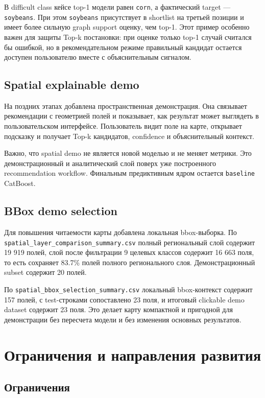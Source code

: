 \documentclass[a4paper,article,14pt]{extarticle}
\begin{document}
В difficult class кейсе top-1 модели равен \texttt{corn}, а фактический target --- \texttt{soybeans}. При этом \texttt{soybeans} присутствует в shortlist на третьей позиции и имеет более сильную graph support оценку, чем top-1. Этот пример особенно важен для защиты Top-k постановки: при оценке только top-1 случай считался бы ошибкой, но в рекомендательном режиме правильный кандидат остается доступен пользователю вместе с объяснительным сигналом.

\subsection{Spatial explainable demo}

На поздних этапах добавлена пространственная демонстрация. Она связывает рекомендации с геометрией полей и показывает, как результат может выглядеть в пользовательском интерфейсе. Пользователь видит поле на карте, открывает подсказку и получает Top-k кандидатов, confidence и объяснительный контекст.

Важно, что spatial demo не является новой моделью и не меняет метрики. Это демонстрационный и аналитический слой поверх уже построенного recommendation workflow. Финальным предиктивным ядром остается \texttt{baseline} CatBoost.

\subsection{BBox demo selection}

Для повышения читаемости карты добавлена локальная bbox-выборка. По \texttt{spatial\_layer\_comparison\_summary.csv} полный региональный слой содержит 19 919 полей, слой после фильтрации 9 целевых классов содержит 16 663 поля, то есть сохраняет 83.7\% полей полного регионального слоя. Демонстрационный subset содержит 20 полей.

По \texttt{spatial\_bbox\_selection\_summary.csv} локальный bbox-контекст содержит 157 полей, с test-строками сопоставлено 23 поля, и итоговый clickable demo dataset содержит 23 поля. Это делает карту компактной и пригодной для демонстрации без пересчета модели и без изменения основных результатов.

\section{Ограничения и направления развития}

\subsection{Ограничения}
\end{document}
